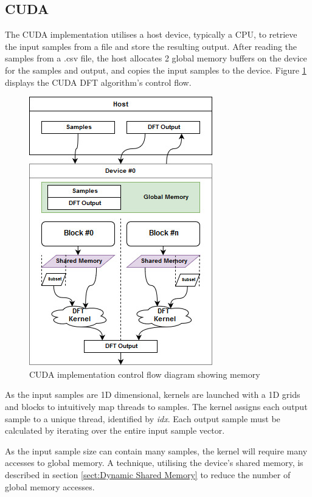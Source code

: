 \documentclass[11pt,a4paper]{article}
\begin{document}
\subsection{CUDA}
The CUDA implementation utilises a host device, typically a CPU, to retrieve the input samples from a file and store the resulting output.   After reading the samples from a .csv file, the host allocates 2 global memory buffers on the device for the samples and output, and copies the input samples to the device.  Figure \ref{fig:cuda_impl1} displays the CUDA DFT algorithm's control flow.

\begin{figure}
\begin{center}
\includegraphics[scale=0.6]{cuda_impl1}
\end{center}
\caption{CUDA implementation control flow diagram showing memory }
\label{fig:cuda_impl1}
\end{figure}

As the input samples are 1D dimensional, kernels are launched with a 1D grids and blocks to intuitively map threads to samples.
 The kernel assigns each output sample to a unique thread, identified by \textit{idx}. Each output sample must be calculated by iterating over the entire input sample vector. 

As the input sample size can contain many samples, the kernel will require many accesses to global memory. A technique, utilising the device's shared memory, is described in section \ref{sect:Dynamic Shared Memory} to reduce the number of global memory accesses.
\end{document}
